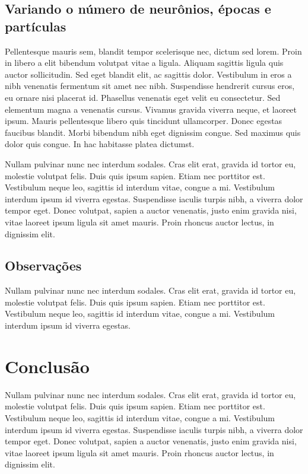 \documentclass[10pt,twocolumn,letterpaper]{article}
\begin{document}
\subsection{Variando o número de neurônios, épocas e partículas}
Pellentesque mauris sem, blandit tempor scelerisque nec, dictum sed lorem. Proin in libero a elit bibendum volutpat vitae a ligula. Aliquam sagittis ligula quis auctor sollicitudin. Sed eget blandit elit, ac sagittis dolor. Vestibulum in eros a nibh venenatis fermentum sit amet nec nibh. Suspendisse hendrerit cursus eros, eu ornare nisi placerat id. Phasellus venenatis eget velit eu consectetur. Sed elementum magna a venenatis cursus. Vivamus gravida viverra neque, et laoreet ipsum. Mauris pellentesque libero quis tincidunt ullamcorper. Donec egestas faucibus blandit. Morbi bibendum nibh eget dignissim congue. Sed maximus quis dolor quis congue. In hac habitasse platea dictumst.

Nullam pulvinar nunc nec interdum sodales. Cras elit erat, gravida id tortor eu, molestie volutpat felis. Duis quis ipsum sapien. Etiam nec porttitor est. Vestibulum neque leo, sagittis id interdum vitae, congue a mi. Vestibulum interdum ipsum id viverra egestas. Suspendisse iaculis turpis nibh, a viverra dolor tempor eget. Donec volutpat, sapien a auctor venenatis, justo enim gravida nisi, vitae laoreet ipsum ligula sit amet mauris. Proin rhoncus auctor lectus, in dignissim elit.

\subsection{Observações}
Nullam pulvinar nunc nec interdum sodales. Cras elit erat, gravida id tortor eu, molestie volutpat felis. Duis quis ipsum sapien. Etiam nec porttitor est. Vestibulum neque leo, sagittis id interdum vitae, congue a mi. Vestibulum interdum ipsum id viverra egestas.

\section{Conclusão}

Nullam pulvinar nunc nec interdum sodales. Cras elit erat, gravida id tortor eu, molestie volutpat felis. Duis quis ipsum sapien. Etiam nec porttitor est. Vestibulum neque leo, sagittis id interdum vitae, congue a mi. Vestibulum interdum ipsum id viverra egestas. Suspendisse iaculis turpis nibh, a viverra dolor tempor eget. Donec volutpat, sapien a auctor venenatis, justo enim gravida nisi, vitae laoreet ipsum ligula sit amet mauris. Proin rhoncus auctor lectus, in dignissim elit.
\end{document}
